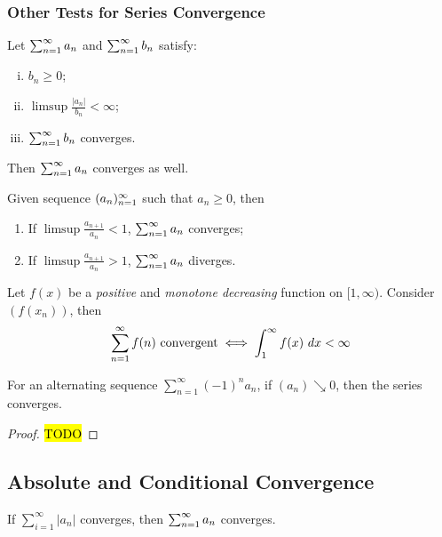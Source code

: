 \documentclass[11pt]{article}
\begin{document}
	\subsubsection{Other Tests for Series Convergence}
	\begin{theorem}
		Let $\sum_{{n}=1}^\infty {a}_{n}$ and $\sum_{{n}=1}^\infty {b}_{n}$ satisfy:
		\begin{enumerate}[(i)]
			\item $b_n \geq 0$;
			\item $\limsup \frac{|a_n|}{b_n} < \infty$;
			\item $\sum_{{n}=1}^\infty {b}_{n}$ converges.
		\end{enumerate}
		Then $\sum_{{n}=1}^\infty {a}_{n}$ converges as well.
	\end{theorem}
	
	\begin{theorem}
		Given sequence $({a}_{n})_{{n}=1}^\infty$ such that $a_n \geq 0$, then 
		\begin{enumerate}
			\item If $\limsup \frac{a_{n+1}}{a_n} < 1$, $\sum_{{n}=1}^\infty {a}_{n}$ converges;
			\item If $\limsup \frac{a_{n+1}}{a_n} > 1$, $\sum_{{n}=1}^\infty {a}_{n}$ diverges.
		\end{enumerate}
	\end{theorem}
	
	\begin{theorem}
		Let $f(x)$ be a \emph{positive} and \emph{monotone decreasing} function on $[1, \infty)$. Consider $(f(x_n))$, then
		\begin{align}
			\sum_{n=1}^\infty f(n) \text{{ convergent}} \iff \int_1^\infty f(x)\ dx < \infty
		\end{align}
	\end{theorem}
	
	\begin{theorem}
		For an alternating sequence $\sum_{n=1}^\infty (-1)^n a_n$, if $(a_n) \searrow 0$, then the series converges.
	\end{theorem}
	
	\begin{proof}
		\hl{TODO}
	\end{proof}


	\subsection{Absolute and Conditional Convergence}
	
	\begin{corollary}
		If $\sum_{i=1}^\infty |a_n|$ converges, then $\sum_{{n}=1}^\infty {a}_{n}$ converges.
	\end{corollary}
	
\end{document}
